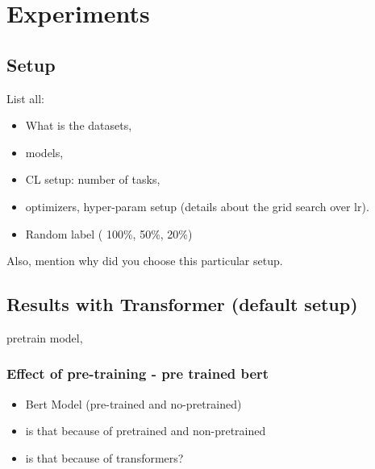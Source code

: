 \documentclass[11pt]{article}
\begin{document}


\section{Experiments}

\subsection{Setup}
List all:
\begin{itemize}
    \item What is the datasets,
    \item  models, 
    \item CL setup: number of tasks, 
    \item optimizers, hyper-param setup (details about the grid search over lr). 
    \item Random label ( 100\%, 50\%, 20\%)
\end{itemize}
Also, mention why did you choose this particular setup.


\subsection{Results with Transformer (default setup)}

pretrain model, 

\subsubsection{Effect of pre-training - pre trained bert}
\begin{itemize}
    \item Bert Model (pre-trained and no-pretrained)
    \item is that because of pretrained and non-pretrained
    \item is that because of transformers?
\end{itemize}
\end{document}
